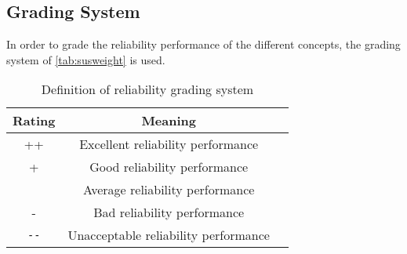 \begin{comment}
\begin{table}[H]
    \centering
    \caption{Reliability Sub Trade-off}
    \label{tab:rel_ove}
    \begin{tabular}{r|>{\centering}p{3.5cm}:>{\centering}p{3cm}:>{\centering}p{3.5cm}|C}
    \textbf{Concept \rotatebox{90}{\hspace{0.5cm}Criterion}}            & 
    \rotatebox{90}{\textbf{Propulsion}}                                   &
    \rotatebox{90}{\textbf{\multicolumn{1}{p{2cm}}{\raggedright{Control surface}}}}     & 
    \rotatebox{90}{\textbf{Wings}}                                        &
    \rotatebox{90}{\textbf{Outcome}}
    \\ \midrule
    The Tailsitter      &  -    &  0  &   +    & 50\% 
    \\\hdashline
    The Tandem          &  + &  - &   -   & 42.5\% 
    \\\hdashline
    The Prandtl Box     &  0   & ++   &  ++ & 82.5\% 
    \\\hdashline
    The Tiltrotor       &  0    &  0    & + & 58.75 \% 
    \\\hdashline
    The Winged Quad.    &   0  &  ++   & +  & 73.75\% 
    \\ \midrule\midrule
    Weight          & 35    &   30  & 35   & 
    \end{tabular}
\end{table}
\end{comment}

\subsection{Grading System}

In order to grade the reliability performance of the different concepts, the grading system of \autoref{tab:susweight} is used. 

\begin{table}[htb]
\centering
\caption{Definition of reliability grading system}
\label{tab:relweight}
    \begin{tabular}{ccc}
        \toprule
        \textbf{Rating}           & \textbf{Meaning}
        \\ \midrule
         ++            & Excellent reliability performance
        \\ \hdashline
        +   & Good reliability performance
        \\ \hdashline
         0          &  Average reliability performance
        \\ \hdashline
          -           & Bad reliability performance
        \\ \hdashline
         \texttt{-{}-}   & Unacceptable reliability performance
        \\ \bottomrule
    \end{tabular}
\end{table}


